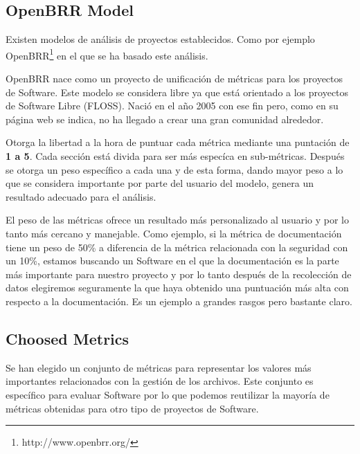 \documentclass[11pt]{scrartcl}
\begin{document}
\subsection{OpenBRR Model}

\par Existen modelos de an\'alisis de proyectos establecidos. Como por ejemplo OpenBRR\footnote{http://www.openbrr.org/} en el que se ha basado este an\'alisis. 

\par OpenBRR nace como un proyecto de unificaci\'on de m\'etricas para los proyectos de Software. Este modelo se considera libre ya que est\'a orientado a los proyectos de Software Libre (FLOSS). Naci\'o en el a\~no 2005 con ese fin pero, como en su p\'agina web se indica, no ha llegado a crear una gran comunidad alrededor.

\par Otorga la libertad a la hora de puntuar cada m\'etrica mediante una puntaci\'on de \textbf{1 a 5}. Cada secci\'on est\'a divida para ser m\'as espec\'ica en sub-m\'etricas. Despu\'es se otorga un peso espec\'ifico a cada una y de esta forma, dando mayor peso a lo que se considera importante por parte del usuario del modelo, genera un resultado adecuado para el an\'alisis.

\par El peso de las m\'etricas ofrece un resultado m\'as personalizado al usuario y por lo tanto m\'as cercano y manejable. Como ejemplo, si la m\'etrica de documentaci\'on tiene un peso de 50\% a diferencia de la m\'etrica relacionada con la seguridad con un 10\%, estamos buscando un Software en el que la documentaci\'on es la parte m\'as importante para nuestro proyecto y por lo tanto despu\'es de la recolecci\'on de datos elegiremos seguramente la que haya obtenido una puntuaci\'on m\'as alta con respecto a la documentaci\'on. Es un ejemplo a grandes rasgos pero bastante claro.

\subsection{Choosed Metrics}

\par Se han elegido un conjunto de m\'etricas para representar los valores m\'as importantes relacionados con la gesti\'on de los archivos. Este conjunto es espec\'ifico para evaluar Software por lo que podemos reutilizar la mayor\'ia de m\'etricas obtenidas para otro tipo de proyectos de Software.
\end{document}
